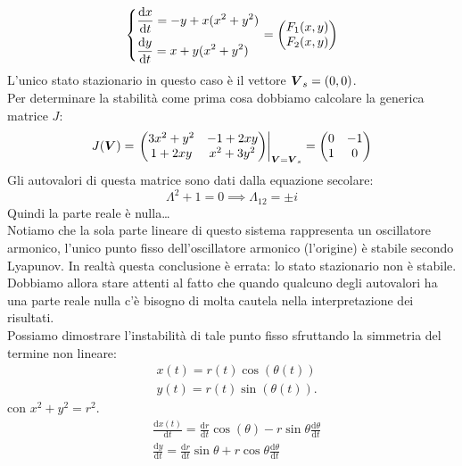 \noindent
\begin{exmp}
    \[\begin{dcases}
	\frac{\text{d} x}{\text{d} t} = - y + x(x^2+y^2)\\
	\frac{\text{d} y}{\text{d} t} = x + y(x^2+y^2)
    \end{dcases}
    =
    \begin{pmatrix} F_1(x, y)\\ F_2(x, y) \end{pmatrix} 
    \] 
    L'unico stato stazionario in questo caso è il vettore $\boldsymbol{V}_s = (0,0)$.\\
    Per determinare la stabilità come prima cosa dobbiamo calcolare la generica matrice $J$:
    \[
	J(\boldsymbol{V})=
        \left.
	\begin{pmatrix} 
	    3x^2 + y^2 & -1 + 2xy \\
	    1 + 2xy & x^2 + 3y^2
	\end{pmatrix} 
        \right|_{\boldsymbol{V} = \boldsymbol{V}_s} = 
	\begin{pmatrix} 0 & -1 \\ 1 & 0 \end{pmatrix} 
    \] 
    Gli autovalori di questa matrice sono dati dalla equazione secolare:
    \[
        \Lambda^2+1 = 0 \implies  \Lambda_{12} = \pm i
    \] 
    Quindi la parte reale è nulla\ldots\\
    Notiamo che la sola parte lineare di questo sistema rappresenta un oscillatore armonico, l'unico punto fisso dell'oscillatore armonico (l'origine) è stabile secondo Lyapunov. In realtà questa conclusione è errata: lo stato stazionario non è stabile. \\
    Dobbiamo allora stare attenti al fatto che quando qualcuno degli autovalori ha una parte reale nulla c'è bisogno di molta cautela nella interpretazione dei risultati.\\
    Possiamo dimostrare l'instabilità di tale punto fisso sfruttando la simmetria del termine non lineare:
    \[\begin{aligned}
	&x(t)= r(t)\cos (\theta (t))\\
	&y(t)= r(t)\sin (\theta (t))
    .\end{aligned}\]
    con $x^2+y^2 = r^2$.
    \[\begin{aligned}
	&\frac{\text{d} x(t)}{\text{d} t} = \frac{\text{d} r}{\text{d} t} \cos (\theta)- r\sin\theta\frac{\text{d} \theta}{\text{d} t} \\
	&\frac{\text{d} y}{\text{d} t} = \frac{\text{d} r}{\text{d} t} \sin\theta  + r\cos\theta  \frac{\text{d} \theta}{\text{d} t} 

\end{aligned}\]
\end{exmp}
